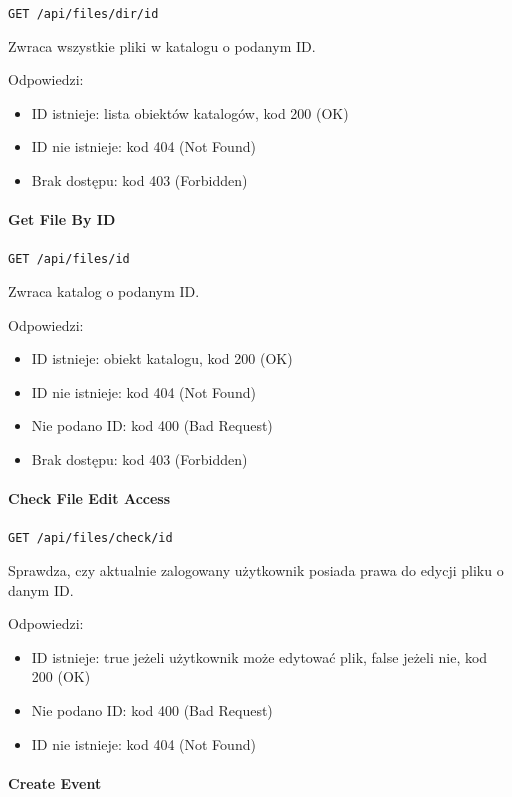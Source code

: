 \documentclass[a4paper,twoside,12pt]{book}
\begin{document}
\texttt{GET /api/files/dir/{id}}

Zwraca wszystkie pliki w katalogu o podanym ID.

Odpowiedzi: 
\begin{itemize}
	\item ID istnieje: lista obiektów katalogów, kod 200 (OK) 
	\item ID nie istnieje: kod 404 (Not Found) 
	\item Brak dostępu: kod 403 (Forbidden)
\end{itemize}

\paragraph{Get File By ID}

\texttt{GET /api/files/{id}}

Zwraca katalog o podanym ID.

Odpowiedzi: 
\begin{itemize}
	\item ID istnieje: obiekt katalogu, kod 200 (OK) 
	\item ID nie istnieje: kod 404 (Not Found) 
	\item Nie podano ID: kod 400 (Bad Request) 
	\item Brak dostępu: kod 403 (Forbidden)
\end{itemize}

\paragraph{Check File Edit Access}

\texttt{GET /api/files/check/{id}}

Sprawdza, czy aktualnie zalogowany użytkownik posiada prawa do edycji pliku o danym ID.

Odpowiedzi: 
\begin{itemize}
	\item ID istnieje: true jeżeli użytkownik może edytować plik, false jeżeli nie, kod 200 (OK) 
	\item  Nie podano ID: kod 400 (Bad Request) 
	\item ID nie istnieje: kod 404 (Not Found)
\end{itemize}

\paragraph{Create Event}
\end{document}
